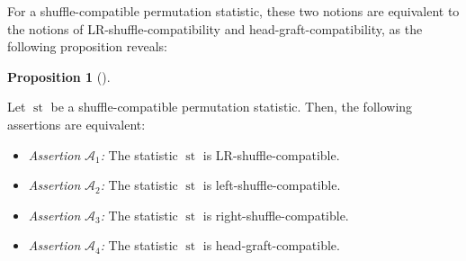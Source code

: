 \documentclass[numbers=enddot,12pt,final,onecolumn,notitlepage]{scrartcl}%
\theoremstyle{definition}
\newtheorem{prop}[theo]{Proposition}
\newenvironment{proposition}[1][]
{\begin{prop}[#1]\begin{leftbar}}
{\end{leftbar}\end{prop}}
\begin{document}
For a shuffle-compatible permutation statistic, these two notions are
equivalent to the notions of LR-shuffle-compatibility and
head-graft-compatibility, as the following proposition reveals:

\begin{proposition}
\label{prop.LRcomp.equivs}Let $\operatorname*{st}$ be a shuffle-compatible
permutation statistic. Then, the following assertions are equivalent:

\begin{itemize}
\item \textit{Assertion }$\mathcal{A}_{1}$\textit{:} The statistic
$\operatorname*{st}$ is LR-shuffle-compatible.

\item \textit{Assertion }$\mathcal{A}_{2}$\textit{:} The statistic
$\operatorname*{st}$ is left-shuffle-compatible.

\item \textit{Assertion }$\mathcal{A}_{3}$\textit{:} The statistic
$\operatorname*{st}$ is right-shuffle-compatible.

\item \textit{Assertion }$\mathcal{A}_{4}$\textit{:} The statistic
$\operatorname*{st}$ is head-graft-compatible.
\end{itemize}
\end{proposition}
\end{document}
